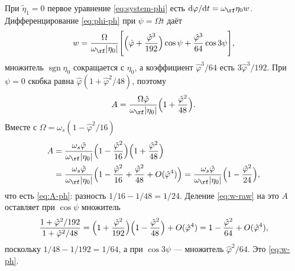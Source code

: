 При $\tilde\eta_1=0$ первое уравнение \eqref{eq:system-phi} есть $\mathrm{d}\varphi/\mathrm{d}t=\omega_\rf\eta_0 w$. Дифференцирование \eqref{eq:phi-ph} при $\psi=\Omega t$ даёт
\begin{equation}
\label{eq:w-raw}
w=\frac{\Omega}{\omega_\rf|\eta_0|}
\Biggl[
\Bigl(\hat\varphi+\frac{\hat\varphi^3}{192}\Bigr)\cos\psi
+\frac{\hat\varphi^3}{64}\cos 3\psi
\Biggr],
\end{equation}
множитель $\operatorname{sgn}\eta_0$ сокращается с $\eta_0$, а коэффициент $\hat\varphi^3/64$ есть $3\hat\varphi^3/192$. При $\psi=0$ скобка равна $\hat\varphi(1+\hat\varphi^2/48)$, поэтому
\begin{equation}
\label{eq:A-Om}
A=\frac{\Omega\hat\varphi}{\omega_\rf|\eta_0|}\Bigl(1+\frac{\hat\varphi^2}{48}\Bigr).
\end{equation}
Вместе с $\Omega=\omega_s(1-\hat\varphi^2/16)$
\begin{align}
A
&=\frac{\omega_s\hat\varphi}{\omega_\rf|\eta_0|}
\Bigl(1-\frac{\hat\varphi^2}{16}\Bigr)\Bigl(1+\frac{\hat\varphi^2}{48}\Bigr)
\nonumber\\
&=\frac{\omega_s\hat\varphi}{\omega_\rf|\eta_0|}
\Bigl(1-\frac{\hat\varphi^2}{16}+\frac{\hat\varphi^2}{48}+O(\hat\varphi^4)\Bigr)
=\frac{\omega_s\hat\varphi}{\omega_\rf|\eta_0|}\Bigl(1-\frac{\hat\varphi^2}{24}\Bigr),
\label{eq:A-from-bm}
\end{align}
что есть \eqref{eq:A-ph}: разность $1/16-1/48=1/24$. Деление \eqref{eq:w-raw} на это $A$ оставляет при $\cos\psi$ множитель
\begin{equation}
\label{eq:cos-coeff}
\frac{1+\hat\varphi^2/192}{1+\hat\varphi^2/48}
=\Bigl(1+\frac{\hat\varphi^2}{192}\Bigr)\Bigl(1-\frac{\hat\varphi^2}{48}\Bigr)+O(\hat\varphi^4)
=1-\frac{\hat\varphi^2}{64}+O(\hat\varphi^4),
\end{equation}
поскольку $1/48-1/192=1/64$, а при $\cos 3\psi$ --- множитель $\hat\varphi^2/64$. Это \eqref{eq:w-ph}.

